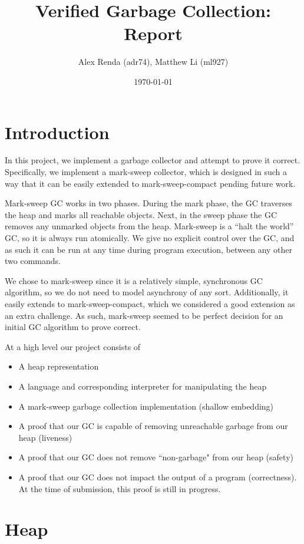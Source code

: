 \documentclass{article}
\title{Verified Garbage Collection: Report}
\author{Alex Renda (adr74), Matthew Li (ml927)}
\date{\today}
\begin{document}
\maketitle
\section{Introduction}
In this project, we implement a garbage collector and attempt to prove it correct. Specifically, we implement a mark-sweep collector, which is designed in such a way that it can be easily extended to mark-sweep-compact pending future work.

Mark-sweep GC works in two phases. During the mark phase, the GC traverses the heap and marks all reachable objects. Next, in the sweep phase the GC removes any unmarked objects from the heap. Mark-sweep is a ``halt the world'' GC, so it is always run atomically. We give no explicit control over the GC, and as such it can be run at any time during program execution, between any other two commands.

We chose to mark-sweep since it is a relatively simple, synchronous GC algorithm, so we do not need to model asynchrony of any sort. Additionally, it easily extends to mark-sweep-compact, which we considered a good extension as an extra challenge. As such, mark-sweep seemed to be perfect decision for an initial GC algorithm to prove correct.

At a high level our project consists of
\begin{itemize}
    \item A heap representation
    \item A language and corresponding interpreter for manipulating the heap
    \item A mark-sweep garbage collection implementation (shallow embedding)
    \item A proof that our GC is capable of removing unreachable garbage from our heap (liveness)
    \item A proof that our GC does not remove ``non-garbage" from our heap (safety)
    \item A proof that our GC does not impact the output of a program (correctness). At the time of submission, this proof is still in progress.
\end{itemize}

\section{Heap}
\end{document}
